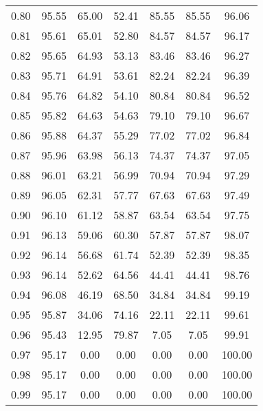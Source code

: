 \begin{tabular}{|c|c|c|c|c|c|c|}
      0.80 &     95.55 &     65.00 &      52.41 &   85.55 &      85.55 &         96.06 \\
      0.81 &     95.61 &     65.01 &      52.80 &   84.57 &      84.57 &         96.17 \\
      0.82 &     95.65 &     64.93 &      53.13 &   83.46 &      83.46 &         96.27 \\
      0.83 &     95.71 &     64.91 &      53.61 &   82.24 &      82.24 &         96.39 \\
      0.84 &     95.76 &     64.82 &      54.10 &   80.84 &      80.84 &         96.52 \\
      0.85 &     95.82 &     64.63 &      54.63 &   79.10 &      79.10 &         96.67 \\
      0.86 &     95.88 &     64.37 &      55.29 &   77.02 &      77.02 &         96.84 \\
      0.87 &     95.96 &     63.98 &      56.13 &   74.37 &      74.37 &         97.05 \\
      0.88 &     96.01 &     63.21 &      56.99 &   70.94 &      70.94 &         97.29 \\
      0.89 &     96.05 &     62.31 &      57.77 &   67.63 &      67.63 &         97.49 \\
      0.90 &     96.10 &     61.12 &      58.87 &   63.54 &      63.54 &         97.75 \\
      0.91 &     96.13 &     59.06 &      60.30 &   57.87 &      57.87 &         98.07 \\
      0.92 &     96.14 &     56.68 &      61.74 &   52.39 &      52.39 &         98.35 \\
      0.93 &     96.14 &     52.62 &      64.56 &   44.41 &      44.41 &         98.76 \\
      0.94 &     96.08 &     46.19 &      68.50 &   34.84 &      34.84 &         99.19 \\
      0.95 &     95.87 &     34.06 &      74.16 &   22.11 &      22.11 &         99.61 \\
      0.96 &     95.43 &     12.95 &      79.87 &    7.05 &       7.05 &         99.91 \\
      0.97 &     95.17 &      0.00 &       0.00 &    0.00 &       0.00 &        100.00 \\
      0.98 &     95.17 &      0.00 &       0.00 &    0.00 &       0.00 &        100.00 \\
      0.99 &     95.17 &      0.00 &       0.00 &    0.00 &       0.00 &        100.00 \\
\bottomrule
\end{tabular}
